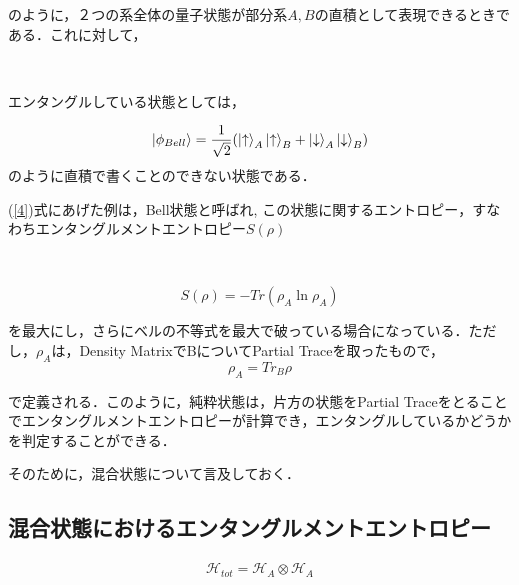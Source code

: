 のように，２つの系全体の量子状態が部分系$A,B$の直積として表現できるときである．これに対して，
\begin{empheqboxed}
\
\

エンタングルしている状態としては，

\begin{equation}
    \label{4}
    \ket{\phi_{Bell}}=\frac{1}{\sqrt{2}}(\ket{\uparrow}_{A}\ket{\uparrow}_{B}+\ket{\downarrow}_{A}\ket{\downarrow}_{B})
    \end{equation}
    のように直積で書くことのできない状態である．
\end{empheqboxed}
(\ref{4})式にあげた例は，Bell状態と呼ばれ,
この状態に関するエントロピー，すなわちエンタングルメントエントロピー$S(\rho)$
\begin{empheqboxed}
\

\begin{equation}
\label{defetg}
S(\rho)=-Tr(\rho_{A}\ln \rho_{A})
\end{equation}
\end{empheqboxed}
を最大にし，さらにベルの不等式を最大で破っている場合になっている．ただし，$\rho_A$は，Density MatrixでBについてPartial Traceを取ったもので，
\begin{equation}
\rho_{A}={Tr}_{B}\rho
\end{equation}

で定義される．このように，純粋状態は，片方の状態をPartial Traceをとることでエンタングルメントエントロピーが計算でき，エンタングルしているかどうかを判定することができる．

そのために，混合状態について言及しておく．
\subsection{混合状態におけるエンタングルメントエントロピー}

\textcolor[rgb]{0.4,0.4,0.4}{\begin{align*}
\mathcal{H}_{tot}=\mathcal{H}_{A}\otimes\mathcal{H}_{A}
\end{align*}}


